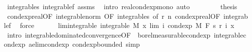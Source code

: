 \begin{isabellebody}
\ integrable{\isacharunderscore}{\kern0pt}s\ integrable{\isacharunderscore}{\kern0pt}{}f\ assms{\isacharparenleft}{\kern0pt}{}{\isacharparenright}{\kern0pt}\ \isamarkupfalse%
\ {\isacharparenleft}{\kern0pt}intro\ real{\isacharunderscore}{\kern0pt}cond{\isacharunderscore}{\kern0pt}exp{\isacharunderscore}{\kern0pt}mono{\isacharcomma}{\kern0pt}\ auto{\isacharparenright}{\kern0pt}\ \isanewline
\ \ \ \ \isamarkupfalse%
\ \isamarkupfalse%
\ {\isacharquery}{\kern0pt}thesis\ \isamarkupfalse%
\ cond{\isacharunderscore}{\kern0pt}exp{\isacharunderscore}{\kern0pt}real{\isacharbrackleft}{\kern0pt}OF\ integrable{\isacharunderscore}{\kern0pt}norm{\isacharcomma}{\kern0pt}\ OF\ integrable{\isacharunderscore}{\kern0pt}s{\isacharcomma}{\kern0pt}\ of\ {\isachardoublequoteopen}r\ n{\isachardoublequoteclose}{\isacharbrackright}{\kern0pt}\ cond{\isacharunderscore}{\kern0pt}exp{\isacharunderscore}{\kern0pt}real{\isacharbrackleft}{\kern0pt}OF\ integrable{\isacharunderscore}{\kern0pt}{}f{\isacharbrackright}{\kern0pt}\ \isamarkupfalse%
\ force\isanewline
\ \ \isamarkupfalse%
\isanewline
\ \ \isamarkupfalse%
\ lim{\isacharunderscore}{\kern0pt}integrable{\isacharcolon}{\kern0pt}\ {\isachardoublequoteopen}integrable\ M\ {\isacharparenleft}{\kern0pt}{\isasymlambda}x{\isachardot}{\kern0pt}\ lim\ {\isacharparenleft}{\kern0pt}{\isasymlambda}i{\isachardot}{\kern0pt}\ cond{\isacharunderscore}{\kern0pt}exp\ M\ F\ {\isacharparenleft}{\kern0pt}s\ {\isacharparenleft}{\kern0pt}r\ i{\isacharparenright}{\kern0pt}{\isacharparenright}{\kern0pt}\ x{\isacharparenright}{\kern0pt}{\isacharparenright}{\kern0pt}{\isachardoublequoteclose}\ \isamarkupfalse%
\ {\isacharparenleft}{\kern0pt}intro\ integrable{\isacharunderscore}{\kern0pt}dominated{\isacharunderscore}{\kern0pt}convergence{\isacharbrackleft}{\kern0pt}OF\ {\isacharunderscore}{\kern0pt}\ borel{\isacharunderscore}{\kern0pt}measurable{\isacharunderscore}{\kern0pt}cond{\isacharunderscore}{\kern0pt}exp{\isacharprime}{\kern0pt}\ integrable{\isacharunderscore}{\kern0pt}cond{\isacharunderscore}{\kern0pt}exp\ ae{\isacharunderscore}{\kern0pt}lim{\isacharunderscore}{\kern0pt}cond{\isacharunderscore}{\kern0pt}exp\ cond{\isacharunderscore}{\kern0pt}exp{\isacharunderscore}{\kern0pt}bounded{\isacharbrackright}{\kern0pt}{\isacharcomma}{\kern0pt}\ simp{\isacharparenright}{\kern0pt}\isanewline
\isanewline
\ \ \isacommand{{\isacharbraceleft}{\kern0pt}}\isamarkupfalse%
\isanewline
\ \ \ \ \isamarkupfalse%

\end{isabellebody}
